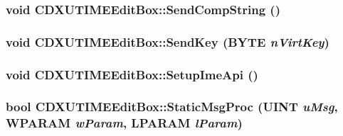 \label{class_c_d_x_u_t_i_m_e_edit_box_aaf6fd90a9cd492f6194bb0a8053fbcc3}
\hypertarget{class_c_d_x_u_t_i_m_e_edit_box_a1f3cf8e4deb6c0881aa4036b3669825c}{
\subsubsection[{SendCompString}]{\setlength{\rightskip}{0pt plus 5cm}void CDXUTIMEEditBox::SendCompString ()}}
\label{class_c_d_x_u_t_i_m_e_edit_box_a1f3cf8e4deb6c0881aa4036b3669825c}
\hypertarget{class_c_d_x_u_t_i_m_e_edit_box_a41a841ff166e8221dd4a82c58661790f}{
\subsubsection[{SendKey}]{\setlength{\rightskip}{0pt plus 5cm}void CDXUTIMEEditBox::SendKey (BYTE {\em nVirtKey})}}
\label{class_c_d_x_u_t_i_m_e_edit_box_a41a841ff166e8221dd4a82c58661790f}
\hypertarget{class_c_d_x_u_t_i_m_e_edit_box_a0f59d99fd3cef32c0a0a1b4c3b5bcfd8}{
\subsubsection[{SetupImeApi}]{\setlength{\rightskip}{0pt plus 5cm}void CDXUTIMEEditBox::SetupImeApi ()}}
\label{class_c_d_x_u_t_i_m_e_edit_box_a0f59d99fd3cef32c0a0a1b4c3b5bcfd8}
\hypertarget{class_c_d_x_u_t_i_m_e_edit_box_ae6c5d46eaaf42af035d3b4dbaa420243}{
\subsubsection[{StaticMsgProc}]{\setlength{\rightskip}{0pt plus 5cm}bool CDXUTIMEEditBox::StaticMsgProc ({\bf UINT} {\em uMsg}, \/  WPARAM {\em wParam}, \/  LPARAM {\em lParam})}}

